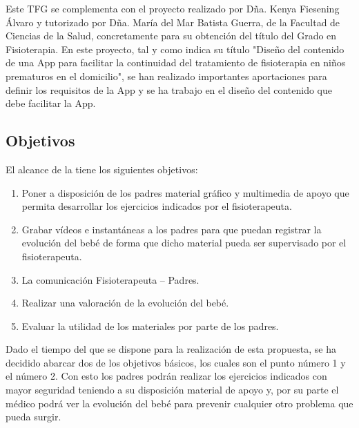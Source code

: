 \bigskip
Este TFG se complementa con el proyecto realizado por Dña. Kenya Fiesening Álvaro y
tutorizado por Dña. María del Mar Batista Guerra, de la Facultad de Ciencias de la
Salud, concretamente para su obtención del título del Grado en Fisioterapia. En este
proyecto, tal y como indica su título "Diseño del contenido de una App para facilitar
la continuidad del tratamiento de fisioterapia en niños prematuros en el domicilio",
se han realizado importantes aportaciones para definir los requisitos de la App y se
ha trabajo en el diseño del contenido que debe facilitar la App.

\bigskip
\subsection{Objetivos}
El alcance de la \textbf{\myTitle} tiene los siguientes objetivos:
\begin{enumerate}
    \item Poner a disposición de los padres material gráfico y multimedia de apoyo que permita desarrollar los ejercicios indicados por el fisioterapeuta.
    \item Grabar vídeos e instantáneas a los padres para que puedan registrar la evolución del bebé de forma que dicho material pueda ser supervisado por el fisioterapeuta.
    \item La comunicación Fisioterapeuta – Padres.
    \item Realizar una valoración de la evolución del bebé.
    \item Evaluar la utilidad de los materiales por parte de los padres.
\end{enumerate}

Dado el tiempo del que se dispone para la realización de esta propuesta, se ha decidido abarcar
dos de los objetivos básicos, los cuales son el punto número 1 y el número 2. Con esto los padres
podrán realizar los ejercicios indicados con mayor seguridad teniendo a su disposición material
de apoyo y, por su parte el médico podrá ver la evolución del bebé para prevenir cualquier otro
problema que pueda surgir.
